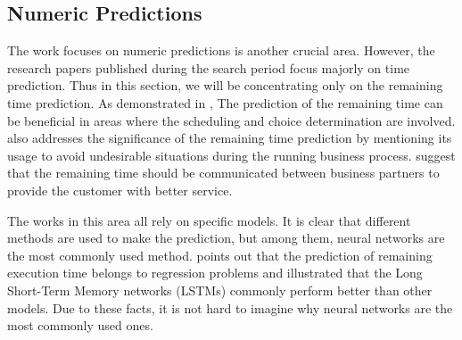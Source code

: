 \documentclass[runningheads]{llncs}
\begin{document}
		
		
		
		
		
		
		
		
		
		
		
		
		
		
		
		
		
		
		
		
		  
		
		\subsection{Numeric Predictions}
		The work focuses on numeric predictions is another crucial area. However, the research papers published during the search period focus majorly on time prediction. Thus in this section, we will be concentrating only on the remaining time prediction. As demonstrated in \cite{art-13}, The prediction of the remaining time can be beneficial in areas where the scheduling and choice determination are involved. \cite{art-15} also addresses the significance of the remaining time prediction by mentioning its usage to avoid undesirable situations during the running business process. \cite{art-29} suggest that the remaining time should be communicated between business partners to provide the customer with better service. 
		
		The works in this area all rely on specific models. It is clear that different methods are used to make the prediction, but among them, neural networks are the most commonly used method. \cite{art-29} points out that the prediction of remaining execution time belongs to regression problems and \cite{art-17} illustrated that the Long Short-Term Memory networks (LSTMs) commonly perform better than other models. Due to these facts, it is not hard to imagine why neural networks are the most commonly used ones.
		
\end{document}
